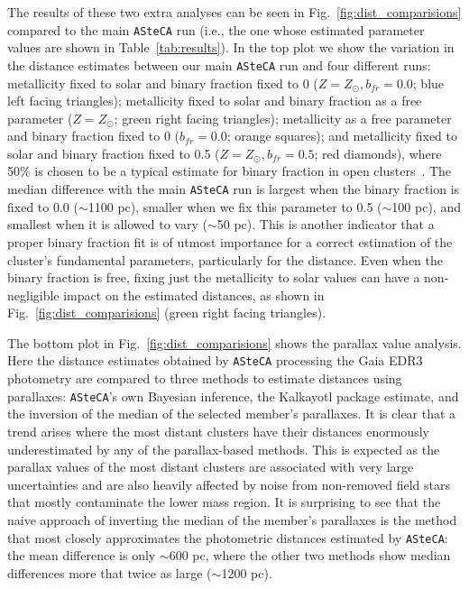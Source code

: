 \documentclass{aa}
\begin{document}
  The results of these two extra analyses can be seen in
  Fig.~\ref{fig:dist_comparisions} compared to the main \texttt{ASteCA} run (i.e., the one whose estimated parameter values are shown in
  Table~\ref{tab:results}).
  In the top plot we show the variation in the distance estimates between our
  main \texttt{ASteCA} run and four different runs: metallicity fixed to solar
  and binary fraction fixed to 0 ($Z=Z_{\odot},b_{fr}=0.0$; blue left
  facing triangles); metallicity fixed to solar and binary fraction as a free
  parameter ($Z=Z_{\odot}$; green right facing triangles); metallicity
  as a free parameter and binary fraction fixed to 0 ($b_{fr}=0.0$; orange
  squares); and metallicity fixed to solar and binary fraction fixed to
  0.5 ($Z=Z_{\odot},b_{fr}=0.5$; red diamonds), where 50\% is
  chosen to be a typical estimate for binary fraction in open
  clusters~\citep{vonHippel_2005}.
  The median difference with the main \texttt{ASteCA} run is largest when the
  binary fraction is fixed to 0.0 ($\sim$1100 pc), smaller when we fix this
  parameter to 0.5 ($\sim$100 pc), and smallest when it is allowed to vary 
  ($\sim$50 pc). This is another indicator that a proper binary fraction fit is
  of utmost importance for a correct  estimation of the cluster's fundamental
  parameters, particularly for the distance. Even when the binary fraction is
  free, fixing just the metallicity to solar values can have a non-negligible impact on the estimated distances, as shown in
  Fig.~\ref{fig:dist_comparisions} (green right facing triangles).

  The bottom plot in Fig.~\ref{fig:dist_comparisions} shows the parallax value
  analysis. Here the distance estimates obtained by \texttt{ASteCA} processing
  the Gaia EDR3 photometry are compared to three methods to estimate distances
  using parallaxes: \texttt{ASteCA}'s own Bayesian inference, the Kalkayotl
  package estimate, and the inversion of the median of the selected member's
  parallaxes. It is clear  that a trend arises where the most distant
  clusters have their distances enormously underestimated by any of the
  parallax-based methods. This is expected as the parallax values of the most
  distant clusters are associated with  very large uncertainties and are also
  heavily affected by noise from non-removed field stars that mostly contaminate
  the lower mass region.
  It is surprising to see that the naive approach of inverting the median of
  the member's parallaxes is the method that most closely approximates the
  photometric distances estimated by \texttt{ASteCA}: the mean difference is
  only $\sim$600 pc, where the other two methods show median differences more
  that twice as large ($\sim$1200 pc).
  \\
\end{document}
